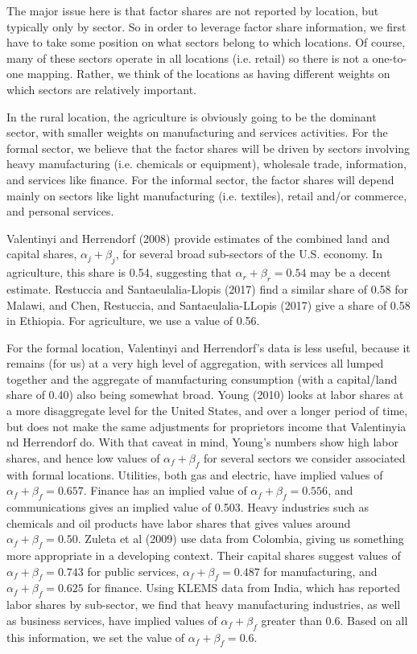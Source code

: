\documentclass[10pt]{article}
\begin{document}
The major issue here is that factor shares are not reported by location, but typically only by sector. So in order to leverage factor share information, we first have to take some position on what sectors belong to which locations. Of course, many of these sectors operate in all locations (i.e. retail) so there is not a one-to-one mapping. Rather, we think of the locations as having different weights on which sectors are relatively important. 

In the rural location, the agriculture is obviously going to be the dominant sector, with smaller weights on manufacturing and services activities. For the formal sector, we believe that the factor shares will be driven by sectors involving heavy manufacturing (i.e. chemicals or equipment), wholesale trade, information, and services like finance. For the informal sector, the factor shares will depend mainly on sectors like light manufacturing (i.e. textiles), retail and/or commerce, and personal services. 

Valentinyi and Herrendorf (2008) provide estimates of the combined land and capital shares, $\alpha_j + \beta_j$, for several broad sub-sectors of the U.S. economy. In agriculture, this share is 0.54, suggesting that $\alpha_r + \beta_r = 0.54$ may be a decent estimate. Restuccia and Santaeulalia-Llopis (2017) find a similar share of 0.58 for Malawi, and Chen, Restuccia, and Santaeulalia-LLopis (2017) give a share of 0.58 in Ethiopia. For agriculture, we use a value of 0.56. 

For the formal location, Valentinyi and Herrendorf's data is less useful, because it remains (for us) at a very high level of aggregation, with services all lumped together and the aggregate of manufacturing consumption (with a capital/land share of 0.40) also being somewhat broad. Young (2010) looks at labor shares at a more disaggregate level for the United States, and over a longer period of time, but does not make the same adjustments for proprietors income that Valentinyia nd Herrendorf do. With that caveat in mind, Young's numbers show high labor shares, and hence low values of $\alpha_f + \beta_f$ for several sectors we consider associated with formal locations. Utilities, both gas and electric, have implied values of $\alpha_f + \beta_f = 0.657$. Finance has an implied value of $\alpha_f + \beta_f = 0.556$, and communications gives an implied value of 0.503. Heavy industries such as chemicals and oil products have labor shares that gives values around $\alpha_f + \beta_f = 0.50$. Zuleta et al (2009) use data from Colombia, giving us something more appropriate in a developing context. Their capital shares suggest values of $\alpha_f + \beta_f = 0.743$ for public services, $\alpha_f + \beta_f = 0.487$ for manufacturing, and $\alpha_f + \beta_f = 0.625$ for finance. Using KLEMS data from India, which has reported labor shares by sub-sector, we find that heavy manufacturing industries, as well as business services, have implied values of $\alpha_f + \beta_f$ greater than 0.6. Based on all this information, we set the value of $\alpha_f + \beta_f = 0.6$.
\end{document}

